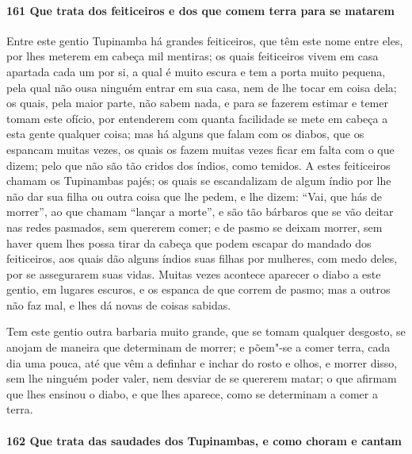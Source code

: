 \paragraph{161 Que trata dos feiticeiros e dos que comem terra para se matarem}

Entre este gentio Tupinamba há grandes feiticeiros, que têm este nome entre eles, por lhes
meterem em cabeça mil mentiras; os quais feiticeiros vivem em casa apartada cada um por
si, a qual é muito escura e tem a porta muito pequena, pela qual não ousa ninguém entrar
em sua casa, nem de lhe tocar em coisa dela; os quais, pela maior parte, não sabem nada, e
para se fazerem estimar e temer tomam este ofício, por entenderem com quanta facilidade se
mete em cabeça a esta gente qualquer coisa; mas há alguns que falam com os diabos, que os
espancam muitas vezes, os quais os fazem muitas vezes ficar em falta com o que dizem; pelo
que não são tão cridos dos índios, como temidos. A estes feiticeiros chamam os Tupinambas
pajés; os quais se escandalizam de algum índio por lhe não dar sua filha ou outra coisa
que lhe pedem, e lhe dizem: ``Vai, que hás de morrer'', ao que chamam ``lançar a morte'',
e são tão bárbaros que se vão deitar nas redes pasmados, sem quererem comer; e de pasmo se
deixam morrer, sem haver quem lhes possa tirar da cabeça que podem escapar do mandado dos
feiticeiros, aos quais dão alguns índios suas filhas por mulheres, com medo deles, por se
assegurarem suas vidas. Muitas vezes acontece aparecer o diabo a este gentio, em lugares
escuros, e os espanca de que correm de pasmo; mas a outros não faz mal, e lhes dá novas de
coisas sabidas.

Tem este gentio outra barbaria muito grande, que se tomam qualquer desgosto, se anojam de
maneira que determinam de morrer; e põem"-se a comer terra, cada dia uma pouca, até que vêm
a definhar e inchar do rosto e olhos, e morrer disso, sem lhe ninguém poder valer, nem
desviar de se quererem matar; o que afirmam que lhes ensinou o diabo, e que lhes aparece,
como se determinam a comer a terra.

\paragraph{162 Que trata das saudades dos Tupinambas, e como choram e cantam}

